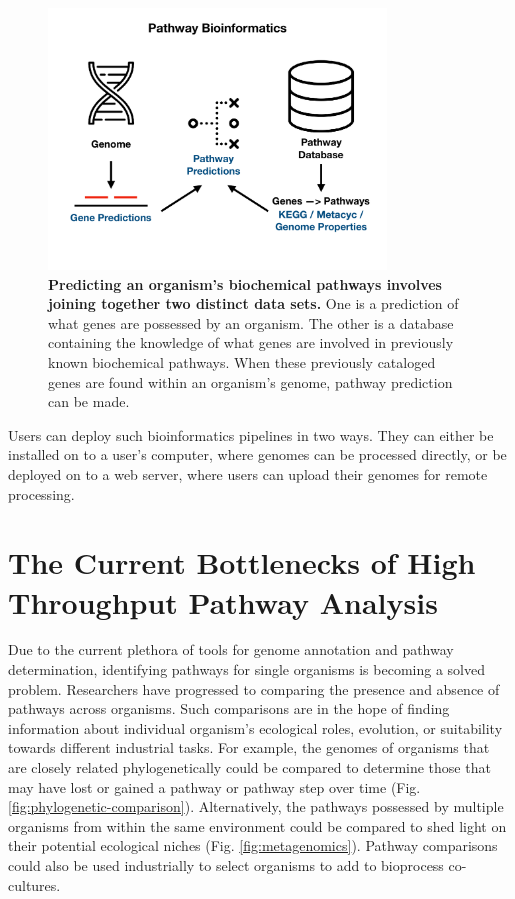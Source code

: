 \begin{figure}[!ht]
  \centering
	\includegraphics[width=0.8\textwidth]{media/pathway_bioinformatics.pdf}
	 \caption[Predicting an organism's biochemical pathways involves joining together two distinct data sets.]{\textbf{Predicting an organism's biochemical pathways involves joining together two distinct data sets.} One is a prediction of what genes are possessed by an organism. The other is a database containing the knowledge of what genes are involved in previously known biochemical pathways. When these previously cataloged genes are found within an organism's genome, pathway prediction can be made.}
	 \label{fig:pathway-analysis-overview}
\end{figure}

Users can deploy such bioinformatics pipelines in two ways. They can either be installed on to a user's computer, where genomes can be processed directly, or be deployed on to a web server, where users can upload their genomes for remote processing.

\section{The Current Bottlenecks of High Throughput Pathway Analysis}

Due to the current plethora of tools for genome annotation and pathway determination, identifying pathways for single organisms is becoming a solved problem. Researchers have progressed to comparing the presence and absence of pathways across organisms. Such comparisons are in the hope of finding information about individual organism's ecological roles, evolution, or suitability towards different industrial tasks. For example, the genomes of organisms that are closely related phylogenetically could be compared to determine those that may have lost or gained a pathway or pathway step over time (Fig. \ref{fig:phylogenetic-comparison}). Alternatively, the pathways possessed by multiple organisms from within the same environment could be compared to shed light on their potential ecological niches (Fig. \ref{fig:metagenomics}). Pathway comparisons could also be used industrially to select organisms to add to bioprocess co-cultures.

